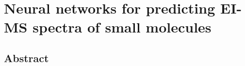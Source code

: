 \chapter{Neural networks for predicting EI-MS spectra of small molecules}\label{sec:massspec}
\thispagestyle{plain}
\vspace{-.5cm}

\section*{Abstract}
    \dsp
    


